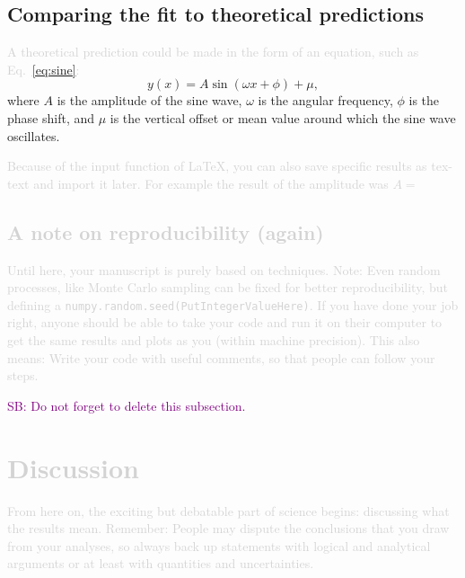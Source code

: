 \documentclass[twocolumn,apj,numberedappendix,appendixfloats]{openjournal}
\newcommand{\SB}[1]{{\textcolor{purple}{SB: #1}}}
\newcommand{\comment}[1]{\textcolor{lightgray}{#1}}
\begin{document}
\subsection{Comparing the fit to theoretical predictions} \label{sec:analysis_comparison}

\comment{A theoretical prediction could be made in the form of an equation, such as Eq.~\ref{eq:sine}:}
\begin{equation}
    y(x) = A \sin(\omega x + \phi) + \mu, \label{eq:sine}
\end{equation}
where $A$ is the amplitude of the sine wave, $\omega$ is the angular frequency, $\phi$ is the phase shift, and $\mu$ is the vertical offset or mean value around which the sine wave oscillates.

\comment{Because of the input function of \LaTeX, you can also save specific results as tex-text and import it later. For example the result of the amplitude was $A=$

\subsection{A note on reproducibility (again)}\label{sec:analysis_reproducibility}

\comment{Until here, your manuscript is purely based on techniques. Note: Even random processes, like Monte Carlo sampling can be fixed for better reproducibility, but defining a \texttt{numpy.random.seed(PutIntegerValueHere)}. If you have done your job right, anyone should be able to take your code and run it on their computer to get the same results and plots as you (within machine precision). This also means: Write your code with useful comments, so that people can follow your steps.}

\SB{Do not forget to delete this subsection.}

\clearpage
\section{Discussion} \label{sec:discussion}

\comment{From here on, the exciting but debatable part of science begins: discussing what the results mean. Remember: People may dispute the conclusions that you draw from your analyses, so always back up statements with logical and analytical arguments or at least with quantities and uncertainties.}

}
\end{document}
